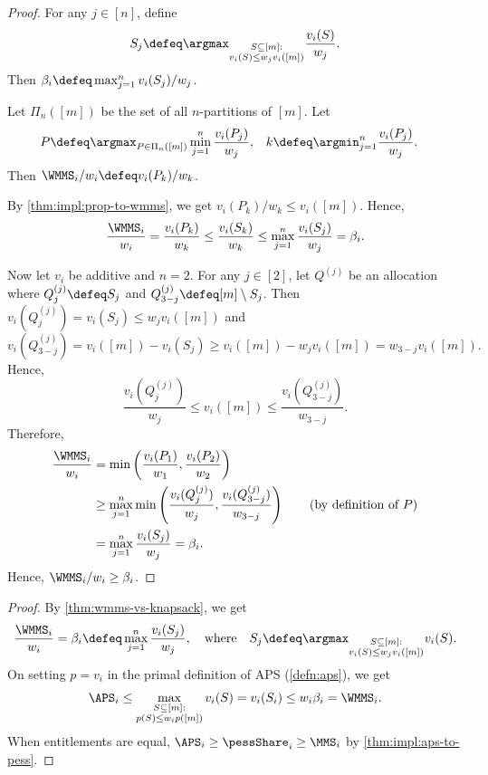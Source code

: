 \begin{proof}
For any $j \in [n]$, define
\[ S_j \defeq \argmax_{\substack{S \subseteq [m]:\\v_i(S) \le w_jv_i([m])}} \frac{v_i(S)}{w_j}. \]
Then $\beta_i \defeq \max_{j=1}^n v_i(S_j)/w_j$.

Let $\Pi_n([m])$ be the set of all $n$-partitions of $[m]$. Let
\begin{align*}
P &\defeq \argmax_{P \in \Pi_n([m])} \min_{j=1}^n \frac{v_i(P_j)}{w_j},
& k &\defeq \argmin_{j=1}^n \frac{v_i(P_j)}{w_j}.
\end{align*}
Then $\WMMS_i/w_i \defeq v_i(P_k)/w_k$.

By \cref{thm:impl:prop-to-wmms}, we get $v_i(P_k)/w_k \le v_i([m])$. Hence,
\[ \frac{\WMMS_i}{w_i} = \frac{v_i(P_k)}{w_k} \le \frac{v_i(S_k)}{w_k}
    \le \max_{j=1}^n \frac{v_i(S_j)}{w_j} = \beta_i. \]

Now let $v_i$ be additive and $n = 2$.
For any $j \in [2]$, let $Q^{(j)}$ be an allocation where $Q^{(j)}_j \defeq S_j$
and $Q^{(j)}_{3-j} \defeq [m] \setminus S_j$.
Then $v_i(Q^{(j)}_j) = v_i(S_j) \le w_jv_i([m])$ and
\[ v_i(Q^{(j)}_{3-j}) = v_i([m]) - v_i(S_j) \ge v_i([m]) - w_jv_i([m]) = w_{3-j}v_i([m]). \]
Hence,
\[ \frac{v_i(Q^{(j)}_j)}{w_j} \le v_i([m]) \le \frac{v_i(Q^{(j)}_{3-j})}{w_{3-j}}. \]
Therefore,
\begin{align*}
\frac{\WMMS_i}{w_i} &= \min\left(\frac{v_i(P_1)}{w_1}, \frac{v_i(P_2)}{w_2}\right)
\\ &\ge \max_{j=1}^n \min\left(\frac{v_i(Q^{(j)}_j)}{w_j}, \frac{v_i(Q^{(j)}_{3-j})}{w_{3-j}}\right)
    \tag{by definition of $P$}
\\ &= \max_{j=1}^n \frac{v_i(S_j)}{w_j} = \beta_i.
\end{align*}
Hence, $\WMMS_i/w_i \ge \beta_i$.
\end{proof}

\begin{proof}
By \cref{thm:wmms-vs-knapsack}, we get
\[ \frac{\WMMS_i}{w_i} = \beta_i \defeq \max_{j=1}^n \frac{v_i(S_j)}{w_j},
\quad\textrm{where}\quad
S_j \defeq \argmax_{\substack{S \subseteq [m]:\\ v_i(S) \le w_jv_i([m])}} v_i(S). \]
On setting $p = v_i$ in the primal definition of APS (\cref{defn:aps}), we get
\[ \APS_i \le \max_{\substack{S \subseteq [m]:\\ p(S) \le w_ip([m])}} v_i(S)
    = v_i(S_i) \le w_i\beta_i = \WMMS_i. \]
When entitlements are equal, $\APS_i \ge \pessShare_i \ge \MMS_i$
by \cref{thm:impl:aps-to-pess}.
\end{proof}

